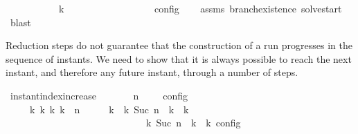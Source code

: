 \begin{isabellebody}
\ \ \ {\isacartoucheopen}{\isasymexists}{\isasymS}{\isachardot}\ {\isacharparenleft}{\isacharparenleft}{\isacharbrackleft}{\isacharbrackright}{\isacharcomma}\ {}\ {\isasymturnstile}\ {\isasymPsi}\ {\isasymtriangleright}\ {\isacharbrackleft}{\isacharbrackright}{\isacharparenright}\ \ {\isasymhookrightarrow}\isactrlbsup k\isactrlesup \ \ {\isasymS}{\isacharparenright}\isanewline
\ \ \ \ \ \ \ \ \ \ \ {\isasymand}\ {\isasymrho}\ {\isasymin}\ {\isasymlbrakk}\ {\isasymS}\ {\isasymrbrakk}\isactrlsub c\isactrlsub o\isactrlsub n\isactrlsub f\isactrlsub i\isactrlsub g{\isacartoucheclose}\isanewline
%
\isadelimproof
\ \ %
\endisadelimproof
%
\isatagproof
{}\isamarkupfalse%
\ assms\ branch{\isacharunderscore}existence{\isacharprime}\ solve{\isacharunderscore}start\ \isamarkupfalse%
\ blast%
\endisatagproof
{\isafoldproof}%
%
\isadelimproof
%
\endisadelimproof
%
\isadelimdocument
%
\endisadelimdocument
%
\isatagdocument
%
\isamarkuptrue%
%
\endisatagdocument
{\isafolddocument}%
%
\isadelimdocument
%
\endisadelimdocument
%
\begin{isamarkuptext}%
Reduction steps do not guarantee that the construction of a run progresses in the
  sequence of instants. We need to show that it is always possible to reach the next 
  instant, and therefore any future instant, through a number of steps.%
\end{isamarkuptext}\isamarkuptrue%
\isamarkupfalse%
\ instant{\isacharunderscore}index{\isacharunderscore}increase{\isacharcolon}\isanewline
\ \ \ {\isacartoucheopen}{\isasymrho}\ {\isasymin}\ {\isasymlbrakk}\ {\isasymGamma}{\isacharcomma}\ n\ {\isasymturnstile}\ {\isasymPsi}\ {\isasymtriangleright}\ {\isasymPhi}\ {\isasymrbrakk}\isactrlsub c\isactrlsub o\isactrlsub n\isactrlsub f\isactrlsub i\isactrlsub g{\isacartoucheclose}\isanewline
\ \ \ \ \ {\isacartoucheopen}{\isasymexists}{\isasymGamma}\isactrlsub k\ {\isasymPsi}\isactrlsub k\ {\isasymPhi}\isactrlsub k\ k{\isachardot}\ {\isacharparenleft}{\isacharparenleft}{\isasymGamma}{\isacharcomma}\ n\ {\isasymturnstile}\ {\isasymPsi}\ {\isasymtriangleright}\ {\isasymPhi}{\isacharparenright}\ \ {\isasymhookrightarrow}\isactrlbsup k\isactrlesup \ \ {\isacharparenleft}{\isasymGamma}\isactrlsub k{\isacharcomma}\ Suc\ n\ {\isasymturnstile}\ {\isasymPsi}\isactrlsub k\ {\isasymtriangleright}\ {\isasymPhi}\isactrlsub k{\isacharparenright}{\isacharparenright}\isanewline
\ \ \ \ \ \ \ \ \ \ \ \ \ \ \ \ \ \ \ \ \ \ \ \ \ {\isasymand}\ {\isasymrho}\ {\isasymin}\ {\isasymlbrakk}\ {\isasymGamma}\isactrlsub k{\isacharcomma}\ Suc\ n\ {\isasymturnstile}\ {\isasymPsi}\isactrlsub k\ {\isasymtriangleright}\ {\isasymPhi}\isactrlsub k\ {\isasymrbrakk}\isactrlsub c\isactrlsub o\isactrlsub n\isactrlsub f\isactrlsub i\isactrlsub g{\isacartoucheclose}\isanewline

\end{isabellebody}
